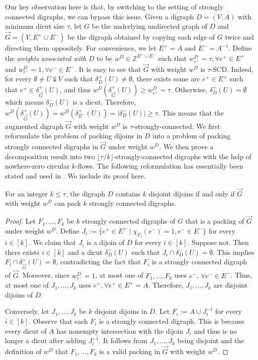 \documentclass[runningheads]{llncs}
\newcommand{\Z}{\mathbb{Z}}
\begin{document}
Our key observation here is that, by switching to the setting of strongly connected digraphs, we can bypass this issue.
Given a digraph $D=(V,A)$ with minimum dicut size $\tau$, let $G$ be the underlying undirected graph of $D$ and $\vec{G}=(V,E^+\cup E^-)$ be the digraph obtained by copying each edge of $G$ twice and directing them oppositely. For convenience, we let $E^+=A$ and $E^-=A^{-1}$. 
Define the \textit{weights associated with $D$} to be $w^D\in\Z^{E^+\cup E^-}$ such that $w^D_{e^+}=\tau,\forall e^+\in E^+$ and $w^D_{e^-}=1,\forall e^-\in E^-$. 
It is easy to see that $\vec{G}$ with weight $w^D$ is $\tau$-SCD. Indeed, for every $\emptyset \neq U\subsetneqq V$ such that $\delta_{D}^+(U)\neq\emptyset$, there exists some arc $e^+\in E^+$ such that $e^+\in \delta_{\vec{G}}^+(U)$, and thus $w^D(\delta_{\vec{G}}^+(U))\geq w^D_{e^+}= \tau$. Otherwise, $\delta_{D}^+(U)=\emptyset$ which means $\delta_{D}^-(U)$ is a dicut.
Therefore, $w^D(\delta_{\vec{G}}^+(U))=w^D(\delta_{E^-}^+(U))=|\delta_{D}^-(U)|\geq \tau$. This means that the augmented digraph $\vec{G}$ with weight $w^D$ is $\tau$-strongly-connected. We first reformulate the problem of packing dijoins in $D$ into a problem of packing strongly connected digraphs in $\vec{G}$ under weight $w^D$. We  then prove a decomposition result into two $\lfloor \tau/k \rfloor$-strongly-connected digraphs with the help of nowhere-zero circular $k$-flows. The following reformulation has essentially been stated and used in \cite{shepherd2005visualizing}. We include its proof here.


\begin{proposition}\label{prop:reformulation_SCD}
     For an integer $k\leq \tau$, the digraph $D$ contains $k$ disjoint dijoins if and only if $\vec{G}$ with weight $w^D$ can pack $k$ strongly connected digraphs.
\end{proposition}
\begin{proof}
        Let $F_1,...,F_k$ be $k$ strongly connected digraphs of $G$ that is a packing of $\vec{G}$ under weight $w^D$. Define $J_i:=\{e^+\in E^+\mid \chi_{F_i}(e^-)=1, e^-\in E^-\}$ for every $i\in [k]$. We claim that $J_i$ is a dijoin of $D$ for every $i\in [k]$. Suppose not. Then there exists $i\in [k]$ and a dicut $\delta_D^-(U)$ such that $J_i\cap \delta_D^-(U)=\emptyset$. This implies $F_i\cap \delta_{\vec{G}}^+(U)=\emptyset$, contradicting the fact that $F_i$ is a strongly connected digraph of $\vec{G}$. Moreover, since $w^D_{e^-}=1$, at most one of $F_1,...,F_k$ uses $e^-$, $\forall e^-\in E^-$. Thus, at most one of $J_1,...,J_k$ uses $e^+, \forall e^+\in E^+=A$. Therefore, $J_1,...,J_k$ are disjoint dijoins of $D$. 
    
    Conversely, let $J_1,...,J_k$ be $k$ disjoint dijoins in $D$.
Let $F_i:=A\cup J_i^{-1}$ for every $i\in [k]$. Observe that each $F_i$ is a strongly connected digraph. This is because every dicut of $A$ has nonempty intersection with the dijoin $J_i$ and thus is no longer a dicut after adding $J_i^{-1}$. It follows from $J_1,...,J_k$ being disjoint and the definition of $w^D$ that $F_1,...,F_k$ is a valid packing in $\vec{G}$ with weight $w^D$.
\end{proof}
\end{document}
